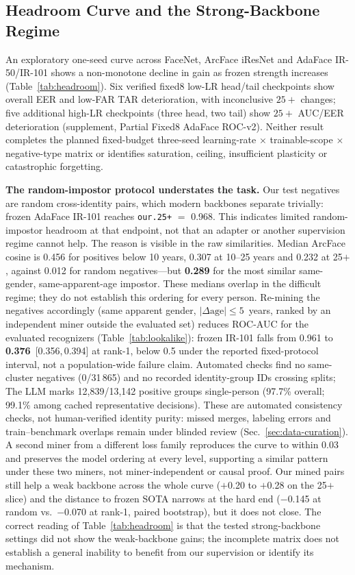 \documentclass[journal]{IEEEtran}
\begin{document}
\subsection{Headroom Curve and the Strong-Backbone Regime}\label{sec:res-headroom}
An exploratory one-seed curve across FaceNet, ArcFace iResNet and AdaFace IR-50/IR-101 shows a non-monotone decline in gain as frozen strength increases (Table~\ref{tab:headroom}). Six verified fixed8 low-LR head/tail checkpoints show overall EER and low-FAR TAR deterioration, with inconclusive $25+$ changes; five additional high-LR checkpoints (three head, two tail) show $25+$ AUC/EER deterioration (supplement, Partial Fixed8 AdaFace ROC-v2). Neither result completes the planned fixed-budget three-seed learning-rate $\times$ trainable-scope $\times$ negative-type matrix or identifies saturation, ceiling, insufficient plasticity or catastrophic forgetting.

\textbf{The random-impostor protocol understates the task.} Our test negatives are random cross-identity pairs, which modern backbones separate trivially: frozen AdaFace IR-101 reaches \texttt{our.25+} $=$ 0.968. This indicates limited random-impostor headroom at that endpoint, not that an adapter or another supervision regime cannot help. The reason is visible in the raw similarities. Median ArcFace cosine is 0.456 for positives below 10 years, 0.307 at 10--25 years and 0.232 at 25$+$, against 0.012 for random negatives---but \textbf{0.289} for the most similar same-gender, same-apparent-age impostor. These medians overlap in the difficult regime; they do not establish this ordering for every person. Re-mining the negatives accordingly (same apparent gender, $|\Delta\text{age}|\leq5$~years, ranked by an independent miner outside the evaluated set) reduces ROC-AUC for the evaluated recognizers (Table~\ref{tab:lookalike}): frozen IR-101 falls from 0.961 to \textbf{0.376}~[0.356,\,0.394] at rank-1, below 0.5 under the reported fixed-protocol interval, not a population-wide failure claim. Automated checks find no same-cluster negatives (0/31\,865) and no recorded identity-group IDs crossing splits; The LLM marks 12{,}839/13{,}142 positive groups single-person (97.7\% overall; 99.1\% among cached representative decisions). These are automated consistency checks, not human-verified identity purity: missed merges, labeling errors and train--benchmark overlaps remain under blinded review (Sec.~\ref{sec:data-curation}). A second miner from a different loss family reproduces the curve to within 0.03 and preserves the model ordering at every level, supporting a similar pattern under these two miners, not miner-independent or causal proof. Our mined pairs still help a weak backbone across the whole curve ($+$0.20 to $+$0.28 on the 25$+$ slice) and the distance to frozen SOTA narrows at the hard end ($-$0.145 at random vs.\ $-$0.070 at rank-1, paired bootstrap), but it does not close. The correct reading of Table~\ref{tab:headroom} is that the tested strong-backbone settings did not show the weak-backbone gains; the incomplete matrix does not establish a general inability to benefit from our supervision or identify its mechanism.
\end{document}
